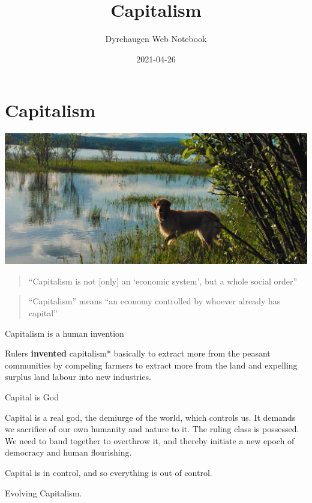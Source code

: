 \documentclass[
]{book}
\title{Capitalism}
\author{Dyrehaugen Web Notebook}
\date{2021-04-26}
\begin{document}
\maketitle

{
\setcounter{tocdepth}{1}
\tableofcontents
}
\hypertarget{capitalism}{%
\chapter{Capitalism}\label{capitalism}}

\includegraphics{fig/zelda.jpg}

\begin{quote}
``Capitalism is not {[}only{]} an `economic system', but a whole social order''
\end{quote}

\begin{quote}
``Capitalism'' means ``an economy controlled by whoever already has capital''
\end{quote}

Capitalism is a human invention

Rulers \textbf{invented} capitalism* basically to
extract more from the peasant communities by compeling farmers to extract more from the land
and expelling surplus land labour into new industries.

Capital is God

Capital is a real god, the demiurge of the world, which controls us. It demands we sacrifice of our own humanity and nature to it. The ruling class is possessed. We need to band together to overthrow it, and thereby initiate a new epoch of democracy and human flourishing.

Capital is in control, and so everything is out of control.

Evolving Capitalism.
\end{document}
